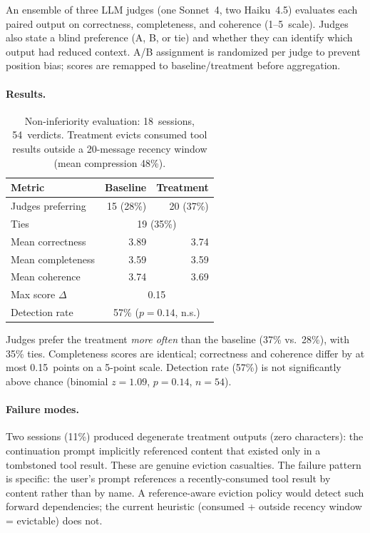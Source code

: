 An ensemble of three LLM judges (one Sonnet~4, two Haiku~4.5)
evaluates each paired output on correctness, completeness, and
coherence (1--5~scale). Judges also state a blind preference
(A, B, or tie) and whether they can identify which output had
reduced context. A/B assignment is randomized per judge to
prevent position bias; scores are remapped to baseline/treatment
before aggregation.

\paragraph{Results.}

\begin{table}[ht]
\centering
\caption{Non-inferiority evaluation: 18~sessions, 54~verdicts.
  Treatment evicts consumed tool results outside a 20-message
  recency window (mean compression 48\%).}
\label{tab:noninferiority}
\small
\begin{tabular}{@{}lrr@{}}
\toprule
\textbf{Metric} & \textbf{Baseline} & \textbf{Treatment} \\
\midrule
Judges preferring & 15 (28\%) & 20 (37\%) \\
Ties & \multicolumn{2}{c}{19 (35\%)} \\
\midrule
Mean correctness & 3.89 & 3.74 \\
Mean completeness & 3.59 & 3.59 \\
Mean coherence & 3.74 & 3.69 \\
Max score $\Delta$ & \multicolumn{2}{c}{0.15} \\
\midrule
Detection rate & \multicolumn{2}{c}{57\% ($p = 0.14$, n.s.)} \\
\bottomrule
\end{tabular}
\end{table}

Judges prefer the treatment \emph{more often} than the baseline
(37\% vs.\ 28\%), with 35\% ties. Completeness scores are identical;
correctness and coherence differ by at most 0.15~points on a 5-point
scale. Detection rate (57\%) is not significantly above chance
(binomial $z = 1.09$, $p = 0.14$, $n = 54$).

\paragraph{Failure modes.}
Two sessions (11\%) produced degenerate treatment outputs (zero
characters): the continuation prompt implicitly referenced content
that existed only in a tombstoned tool result. These are genuine
eviction casualties. The failure pattern is specific: the user's
prompt references a recently-consumed tool result by content rather
than by name. A reference-aware eviction policy would detect such
forward dependencies; the current heuristic (consumed + outside
recency window = evictable) does not.

